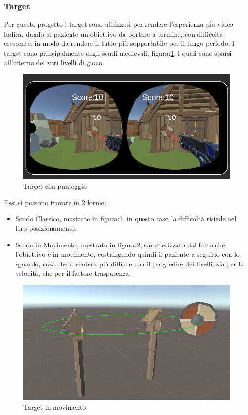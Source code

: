 \documentclass[
a4paper,
cleardoublepage=empty,
headings=twolinechapter,
numbers=autoenddot,
]{scrbook}
\begin{document}
    \subsubsection{Target}
    Per questo progetto i target sono utilizzati per rendere l'esperienza più video ludica, dando al paziente un obiettivo da portare a termine, con difficoltà crescente, in modo da rendere il tutto più sopportabile per il lungo periodo.
    I target sono principalmente degli scudi medievali, figura:\ref{fig:target_score}, i quali sono sparsi all'interno dei vari livelli di gioco.
    \begin{figure}[H]
	  	\centering
	  	\includegraphics[width=0.7\linewidth]{image/target_score}
	  	\caption{Target con punteggio}
	  	\label{fig:target_score}
    \end{figure}
    Essi si possono trovare in 2 forme:
    \begin{itemize}
       \item Scudo Classico, mostrato in figura:\ref{fig:target_score}, in questo caso la difficoltà risiede nel loro posizionamento.
       \item Scudo in Movimento, mostrato in figura:\ref{fig:target_movimento}, caratterizzato dal fatto che l'obiettivo è in movimento, costringendo quindi il paziente a seguirlo con lo sguardo, cosa che diventerà più difficile con il progredire dei livelli, sia per la velocità, che per il fattore trasparenza.
      \end{itemize}
  \begin{figure}[H]
  	\centering
  	\includegraphics[width=0.7\linewidth]{image/target_movimento}
  	\caption{Target in movimento}
  	\label{fig:target_movimento}
  \end{figure}
\end{document}

